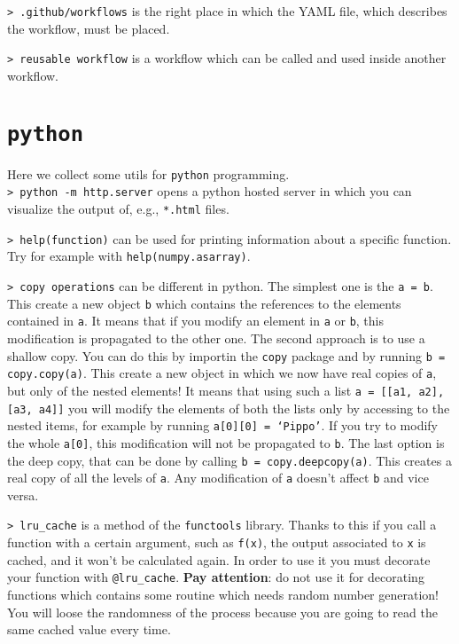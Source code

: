 \documentclass[11pt]{article}
\newcommand{\cmd}[1]{\colorbox{light-gray}{\textcolor{gio}{\texttt{#1}}}}
\begin{document}
\begin{multicols}{2}
\cmd{> .github/workflows} is the right place in which the YAML file, which 
describes the workflow, must be placed.

\cmd{> reusable workflow} is a workflow which can be called and used inside 
another workflow.

\section{\texttt{python}}

Here we collect some utils for \texttt{python} programming. \\

\cmd{> python -m http.server} opens a python hosted server in which you can 
visualize the output of, e.g., \texttt{*.html} files.

\cmd{> help(function)} can be used for printing information about a specific 
function.
Try for example with \texttt{help(numpy.asarray)}.


\cmd{> copy operations} can be different in python. The simplest one is the 
\texttt{a = b}. This create a new object \texttt{b} which contains the references
to the elements contained in \texttt{a}. It means that if you modify an element in
\texttt{a} or \texttt{b}, this modification is propagated to the other one. 
The second approach is to use a shallow copy. You can do this by importin the 
\texttt{copy} package and by running \texttt{b = copy.copy(a)}. This create a
new object in which we now have real copies of \texttt{a}, but only of the nested
elements! It means that using such a list \texttt{a = [[a1, a2], [a3, a4]]} you will 
modify the elements of both the lists only by accessing to the nested items, for 
example by running \texttt{a[0][0] = `Pippo'}. If you try to modify the whole 
\texttt{a[0]}, this modification will not be propagated to \texttt{b}. The last 
option is the deep copy, that can be done by calling \texttt{b = copy.deepcopy(a)}.
This creates a real copy of all the levels of \texttt{a}. Any modification of \texttt{a}
doesn't affect \texttt{b} and vice versa. 

\cmd{> lru\_cache} is a method of the \texttt{functools} library. Thanks to this
if you call a function with a certain argument, such as \texttt{f(x)}, the output
associated to \texttt{x} is cached, and it won't be calculated again. In order
to use it you must decorate your function with \texttt{@lru\_cache}. \textbf{Pay
attention}: do not use it for decorating functions which contains some routine
which needs random number generation! You will loose the randomness of the process
because you are going to read the same cached value every time.


\end{multicols}
\end{document}
